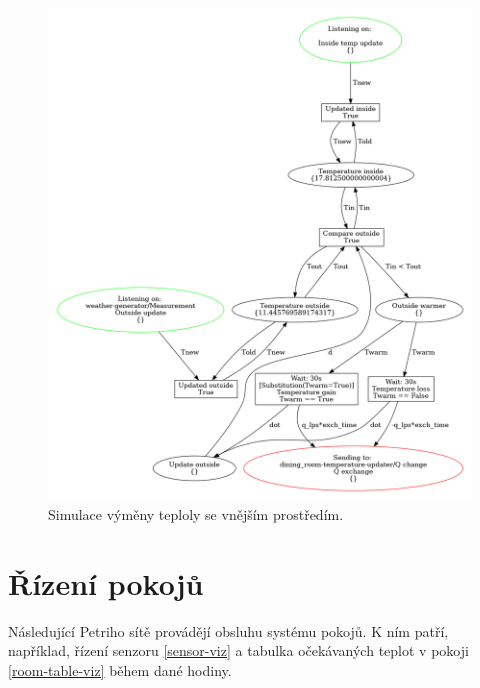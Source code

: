 \begin{figure}[htb]
  \centering
  \includegraphics[width=\textwidth]{obrazky-figures/room-exchange.png}
  \caption{Simulace výměny teploly se vnějším prostředím.}
  \label{exchange-viz}
\end{figure}


\section{Řízení pokojů}

Následující Petriho sítě provádějí obsluhu systému pokojů. K ním patří, například, řízení senzoru \ref{sensor-viz} a tabulka očekávaných teplot v pokoji \ref{room-table-viz} během dané hodiny.

